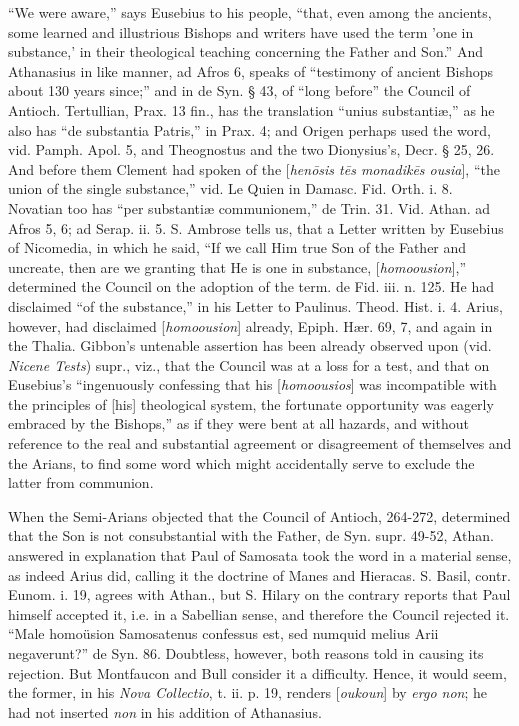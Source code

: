 ``We were aware,'' says Eusebius to his people, ``that,
even among the ancients, some learned and illustrious Bishops and
writers have used the term 'one in substance,' in their theological
teaching concerning the Father and Son.'' And Athanasius in like
manner, ad Afros 6, speaks of ``testimony of ancient Bishops about 130
years since;'' and in de Syn. § 43, of ``long before'' the Council of
Antioch. Tertullian, Prax. 13 fin., has the translation ``unius
substantiæ,'' as he also has ``de substantia Patris,'' in Prax. 4; and
Origen perhaps used the word, vid. Pamph. Apol. 5, and Theognostus and
the two Dionysius's, Decr. § 25, 26. And before them Clement had
spoken of the [\emph{hen\={o}sis t\={e}s monadik\={e}s ousia}],
``the union of the single substance,'' vid. Le Quien in Damasc. Fid.
Orth. i. 8. Novatian too has ``per substantiæ communionem,'' de Trin.
31. Vid. Athan. ad Afros 5, 6; ad Serap. ii. 5. S. Ambrose tells us,
that a Letter written by Eusebius of Nicomedia, in which he said, ``If
we call Him true Son of the Father and uncreate, then are we granting
that He is one in substance, [\emph{homoousion}],'' determined the
Council on the adoption of the term. de Fid. iii. n. 125. He had
disclaimed ``of the substance,'' in his Letter to Paulinus. Theod. Hist.
i. 4. Arius, however, had disclaimed [\emph{homoousion}] already,
Epiph. Hær. 69, 7, and again in the Thalia. Gibbon's untenable
assertion has been already observed upon (vid. \emph{Nicene Tests})
supr., viz., that the Council was at a loss for a test, and that on
Eusebius's ``ingenuously confessing that his [\emph{homoousios}] was
incompatible with the principles of [his] theological system, the
fortunate opportunity was eagerly embraced by the Bishops,'' as if they
were bent at all hazards, and without reference to the real and
substantial agreement or disagreement of themselves and the Arians, to
find some word which might accidentally serve to exclude the latter
from communion.

When the Semi-Arians objected that the Council of
Antioch, 264-272, determined that the Son is not consubstantial
with the Father, de Syn. supr. 49-52, Athan. answered in explanation
that Paul of Samosata took the word in a material sense, as indeed
Arius did, calling it the doctrine of Manes and Hieracas. S. Basil,
contr. Eunom. i. 19, agrees with Athan., but S. Hilary on the contrary
reports that Paul himself accepted it, i.e. in a Sabellian sense, and
therefore the Council rejected it. ``Male homoüsion Samosatenus
confessus est, sed numquid melius Arii negaverunt?'' de Syn. 86.
Doubtless, however, both reasons told in causing its rejection. But
Montfaucon and Bull consider it a difficulty. Hence, it would seem,
the former, in his \emph{Nova Collectio}, t. ii. p. 19, renders [\emph{oukoun}]
by \emph{ergo non}; he had not inserted \emph{non} in his addition of
Athanasius.

